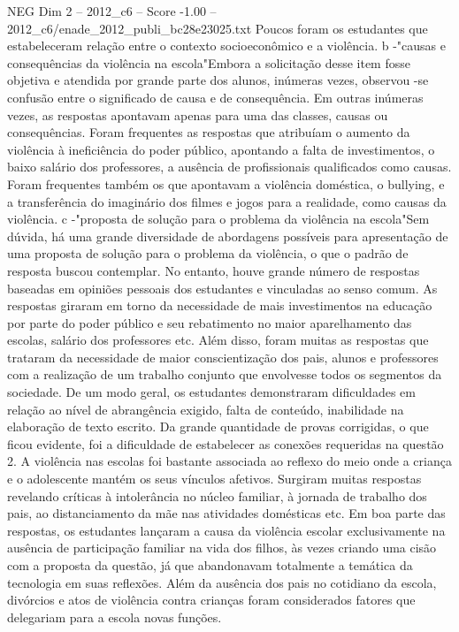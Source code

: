 \begin{textsample}{NEG Dim 2 – 2012\_c6 – Score -1.00 – 2012\_c6/enade\_2012\_publi\_bc28e23025.txt}
Poucos foram os estudantes que estabeleceram relação entre o contexto socioeconômico e a violência. b -"causas e consequências da violência na escola"Embora a solicitação desse item fosse objetiva e atendida por grande parte dos alunos, inúmeras vezes, observou -se confusão entre o significado de causa e de consequência.
Em outras inúmeras vezes, as respostas apontavam apenas para uma das classes, causas ou consequências.
Foram frequentes as respostas que atribuíam o aumento da violência à ineficiência do poder público, apontando a falta de investimentos, o baixo salário dos professores, a ausência de profissionais qualificados como causas.
Foram frequentes também os que apontavam a violência doméstica, o bullying, e a transferência do imaginário dos filmes e jogos para a realidade, como causas da violência. c -"proposta de solução para o problema da violência na escola"Sem dúvida, há uma grande diversidade de abordagens possíveis para apresentação de uma proposta de solução para o problema da violência, o que o padrão de resposta buscou contemplar.
No entanto, houve grande número de respostas baseadas em opiniões pessoais dos estudantes e vinculadas ao senso comum.
As respostas giraram em torno da necessidade de mais investimentos na educação por parte do poder público e seu rebatimento no maior aparelhamento das escolas, salário dos professores etc.
Além disso, foram muitas as respostas que trataram da necessidade de maior conscientização dos pais, alunos e professores com a realização de um trabalho conjunto que envolvesse todos os segmentos da sociedade.
De um modo geral, os estudantes demonstraram dificuldades em relação ao nível de abrangência exigido, falta de conteúdo, inabilidade na elaboração de texto escrito.
Da grande quantidade de provas corrigidas, o que ficou evidente, foi a dificuldade de estabelecer as conexões requeridas na questão 2.
A violência nas escolas foi bastante associada ao reflexo do meio onde a criança e o adolescente mantém os seus vínculos afetivos.
Surgiram muitas respostas revelando críticas à intolerância no núcleo familiar, à jornada de trabalho dos pais, ao distanciamento da mãe nas atividades domésticas etc.
Em boa parte das respostas, os estudantes lançaram a causa da violência escolar exclusivamente na ausência de participação familiar na vida dos filhos, às vezes criando uma cisão com a proposta da questão, já que abandonavam totalmente a temática da tecnologia em suas reflexões.
Além da ausência dos pais no cotidiano da escola, divórcios e atos de violência contra crianças foram considerados fatores que delegariam para a escola novas funções.

\end{textsample}
